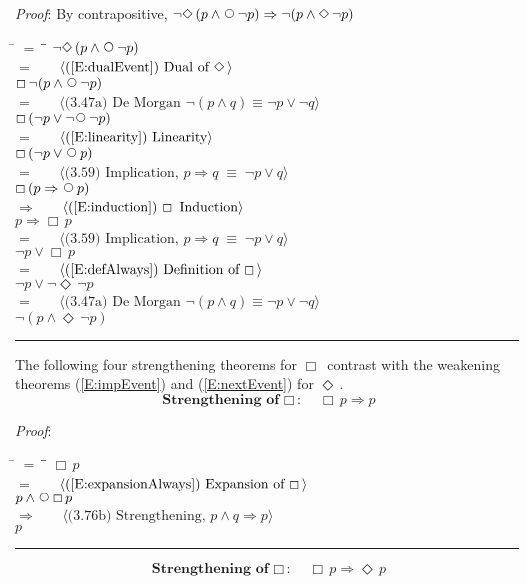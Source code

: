 \documentclass[12pt, fleqn, leqno]{article}
\newcommand{\lgap}{2pt}                             %
\newcommand{\mymathindent}{24pt}                    %
\newcommand{\equivs}{\ensuremath{\;\equiv\;}}       %
\newcommand{\impl}{\ensuremath{\Rightarrow}}        %
\newcommand{\Next}{\;\,\text{\raisebox{3.5pt}{\circle{6}}}}
\newcommand{\Event}{\Diamond\,}
\newcommand{\Always}{\Box\,}
\newcommand{\myqed}{\rule[-.23ex]{1.2ex}{2.0ex}}
\newcommand{\myqedtab}{\hspace{384pt}}              %
\newcommand{\Gll} {\langle}                         %
\newcommand{\Ggg} {\rangle}                         %
\newcommand{\Hint}[1]     {\ \ \ $\Gll              \mbox{#1} \Ggg$ }   %
\begin{document}
\emph{Proof}: By contrapositive, $\neg\Event(p\land\Next\neg p)\impl\neg(p\land \Event\neg p)$
\begin{tabbing}
\hspace{\mymathindent} \= $= \;$ \= \myqedtab \= \kill
  \> \>   $\neg\Event(p\land\Next\neg p)$\\[\lgap]
  \> $=$  \>  \Hint{(\ref{E:dualEvent}) Dual of $\Event$}\\[\lgap]
  \> \>   $\Always\neg(p\land\Next\neg p)$\\[\lgap]
  \> $=$  \>  \Hint{(3.47a) De Morgan $\neg (p \land q) \equiv \neg p \lor \neg q$}\\[\lgap]
  \> \>   $\Always(\neg p\lor\neg\Next\neg p)$\\[\lgap]
  \> $=$  \>  \Hint{(\ref{E:linearity}) Linearity}\\[\lgap]
  \> \>   $\Always(\neg p\lor\Next p)$\\[\lgap]
  \> $=$  \>  \Hint{(3.59) Implication, $p\impl q \equivs \neg p \lor q$}\\[\lgap]
  \> \>   $\Always(p\impl\Next p)$\\[\lgap]
  \> $\impl$  \>  \Hint{(\ref{E:induction}) $\Always$ Induction}\\[\lgap]
  \> \>   $p\impl\Always p$\\[\lgap]
  \> $=$  \>  \Hint{(3.59) Implication, $p\impl q \equivs \neg p \lor q$}\\[\lgap]
  \> \>   $\neg p\lor\Always p$\\[\lgap]
  \> $=$  \>  \Hint{(\ref{E:defAlways}) Definition of $\Always$}\\[\lgap]
  \> \>   $\neg p\lor\neg\Event\neg p$\\[\lgap]
  \> $=$  \>  \Hint{(3.47a) De Morgan $\neg (p \land q) \equiv \neg p \lor \neg q$}\\[\lgap]
  \> \>   $\neg(p\land \Event\neg p)$ \quad \myqed
\end{tabbing}

The following four strengthening theorems for $\Always$ contrast with the weakening theorems
(\ref{E:impEvent}) and (\ref{E:nextEvent})
for $\Event$.
\begin{equation}\label{E:impAlways}
\textbf{Strengthening of $\Always$:}\quad \Always p \impl p
\end{equation}

\emph{Proof}:
\begin{tabbing}
\hspace{\mymathindent} \= $= \;$ \= \myqedtab \= \kill
  \> \>   $\Always p$\\[\lgap]
  \> $=$  \>  \Hint{(\ref{E:expansionAlways}) Expansion of $\Always$}\\[\lgap]
  \> \>   $p \land \Next\Always p$\\[\lgap]
  \> $\impl$  \>  \Hint{(3.76b) Strengthening, $p\land q \impl p$}\\[\lgap]
  \> \>   $p$ \quad \myqed
\end{tabbing}
\begin{equation}\label{E:impAlwaysE}
\textbf{Strengthening of $\Always$:}\quad \Always p \impl \Event p
\end{equation}
\end{document}
